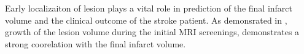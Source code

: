 Early localizaiton of lesion plays a vital role in prediction of
the final infarct volume and the clinical outcome of the stroke
patient. As demonsrated in \cite{lesk:1977}, growth of the lesion
volume during the initial MRI screenings, demonstrates a strong coorelation
with the final infarct volume. 

